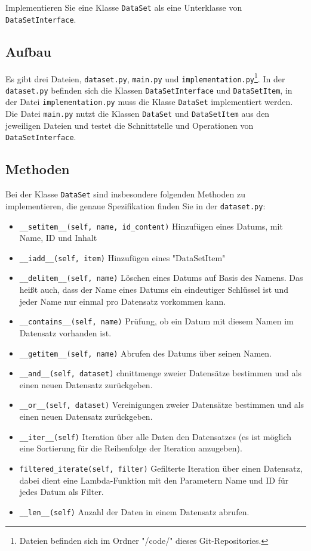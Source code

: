 \documentclass[
12pt,     %
a4paper,     %
parskip=full   %
]{scrartcl}
\begin{document}
        Implementieren Sie eine Klasse \verb|DataSet| als eine Unterklasse von \verb|DataSetInterface|.



    \subsection{Aufbau}
    Es gibt drei Dateien, \verb|dataset.py|, \verb|main.py| und \verb|implementation.py|\footnote{Dateien befinden sich im Ordner "/code/" dieses Git-Repositories.}.
    In der \verb|dataset.py| befinden sich die Klassen \verb|DataSetInterface| und \verb|DataSetItem|,
    in der Datei \verb|implementation.py| muss die Klasse \verb|DataSet| implementiert werden.
    Die Datei \verb|main.py| nutzt die Klassen \verb|DataSet| und \verb|DataSetItem| aus den jeweiligen Dateien und testet die Schnittstelle und Operationen von \verb|DataSetInterface|.


    \subsection{Methoden}
    Bei der Klasse \verb|DataSet| sind insbesondere folgenden Methoden zu implementieren, die genaue Spezifikation finden Sie in der \verb|dataset.py|:
    \begin{itemize}
        \item \verb|__setitem__(self, name, id_content)| Hinzufügen eines Datums, mit Name, ID und Inhalt
        \item \verb|__iadd__(self, item)| Hinzufügen eines "DataSetItem"
        \item \verb|__delitem__(self, name)| Löschen eines Datums auf Basis des Namens. Das heißt auch, dass der Name eines Datums ein eindeutiger Schlüssel ist und jeder Name nur einmal pro Datensatz vorkommen kann.
        \item \verb|__contains__(self, name)| Prüfung, ob ein Datum mit diesem Namen im Datensatz vorhanden ist.
        \item \verb|__getitem__(self, name)| Abrufen des Datums über seinen Namen.
        \item \verb|__and__(self, dataset)| chnittmenge zweier Datensätze bestimmen und als einen neuen Datensatz zurückgeben.
        \item \verb|__or__(self, dataset)| Vereinigungen zweier Datensätze bestimmen und als einen neuen Datensatz zurückgeben.
        \item \verb|__iter__(self)| Iteration über alle Daten den Datensatzes (es ist möglich eine Sortierung für die Reihenfolge der Iteration anzugeben).
        \item \verb|filtered_iterate(self, filter)| Gefilterte Iteration über einen Datensatz, dabei dient eine Lambda-Funktion mit den Parametern Name und ID für jedes Datum als Filter.
        \item \verb|__len__(self)| Anzahl der Daten in einem Datensatz abrufen.

    \end{itemize}
\end{document}
